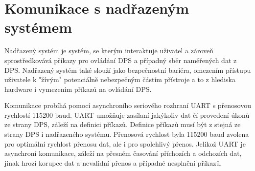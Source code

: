 \section{Komunikace s nadřazeným systémem}
Nadřazený systém je systém, se kterým interaktuje uživatel a zároveň sprostředkovává příkazy pro ovládání DPS a případný sběr naměřených dat z DPS.
Nadřazený systém také slouží jako bezpečnostní bariéra, omezením přístupu uživatele k "žívým" potenciálně nebezpečným částím přístroje a to z hlediska hardware i vymezením příkazů na ovládání DPS.
\par
Komunikace probíhá pomocí asynchroního seriového rozhraní UART s přenosovou rychlostí 115200 baud.
UART umožňuje zasílaní jakýkoliv dat čí provedení úkonů ze strany DPS, záleží na definici příkazů. Definice příkazů musí být z stejná ze strany DPS i nadřazeného systému.
Přenosová rychlost byla 115200 baud zvolena pro optimální rychlost přenosu dat, ale i pro spolehlivý přenos.
Jelikož UART je asynchroní komunikace, záleží na přesném časování příchozích a odchozích dat,
jinak hrozí korupce dat a nevalidní přenos a případné nesplnění příkazů.